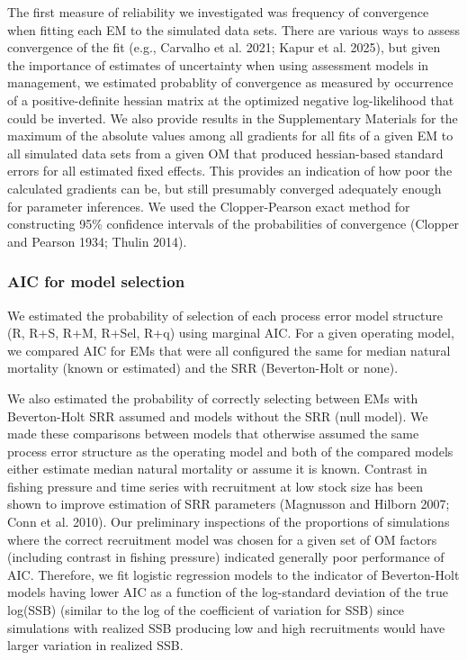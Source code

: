 \documentclass[
  12pt,
]{article}
\begin{document}
The first measure of reliability we investigated was frequency of
convergence when fitting each EM to the simulated data sets. There are
various ways to assess convergence of the fit (e.g., Carvalho et al.
2021; Kapur et al. 2025), but given the importance of estimates of
uncertainty when using assessment models in management, we estimated
probablity of convergence as measured by occurrence of a
positive-definite hessian matrix at the optimized negative
log-likelihood that could be inverted. We also provide results in the
Supplementary Materials for the maximum of the absolute values among all
gradients for all fits of a given EM to all simulated data sets from a
given OM that produced hessian-based standard errors for all estimated
fixed effects. This provides an indication of how poor the calculated
gradients can be, but still presumably converged adequately enough for
parameter inferences. We used the Clopper-Pearson exact method for
constructing 95\% confidence intervals of the probabilities of
convergence (Clopper and Pearson 1934; Thulin 2014).

\hypertarget{aic-for-model-selection}{%
\subsubsection*{AIC for model selection}\label{aic-for-model-selection}}

We estimated the probability of selection of each process error model
structure (R, R+S, R+M, R+Sel, R+q) using marginal AIC. For a given
operating model, we compared AIC for EMs that were all configured the
same for median natural mortality (known or estimated) and the SRR
(Beverton-Holt or none).

We also estimated the probability of correctly selecting between EMs
with Beverton-Holt SRR assumed and models without the SRR (null model).
We made these comparisons between models that otherwise assumed the same
process error structure as the operating model and both of the compared
models either estimate median natural mortality or assume it is known.
Contrast in fishing pressure and time series with recruitment at low
stock size has been shown to improve estimation of SRR parameters
(Magnusson and Hilborn 2007; Conn et al. 2010). Our preliminary
inspections of the proportions of simulations where the correct
recruitment model was chosen for a given set of OM factors (including
contrast in fishing pressure) indicated generally poor performance of
AIC. Therefore, we fit logistic regression models to the indicator of
Beverton-Holt models having lower AIC as a function of the log-standard
deviation of the true log(SSB) (similar to the log of the coefficient of
variation for SSB) since simulations with realized SSB producing low and
high recruitments would have larger variation in realized SSB.
\end{document}
